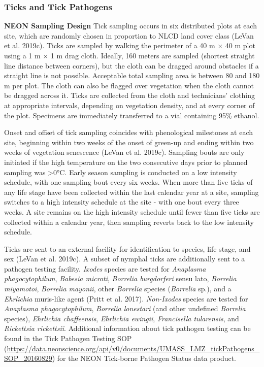 \documentclass[
  12pt,
]{article}
\begin{document}
\hypertarget{ticks-and-tick-pathogens}{%
\subsubsection{Ticks and Tick Pathogens}\label{ticks-and-tick-pathogens}}

\textbf{NEON Sampling Design} Tick sampling occurs in six distributed plots at each site, which are randomly chosen in proportion to NLCD land cover class (LeVan et al. 2019c). Ticks are sampled by walking the perimeter of a 40 m \(\times\) 40 m plot using a 1 m \(\times\) 1 m drag cloth. Ideally, 160 meters are sampled (shortest straight line distance between corners), but the cloth can be dragged around obstacles if a straight line is not possible. Acceptable total sampling area is between 80 and 180 m per plot. The cloth can also be flagged over vegetation when the cloth cannot be dragged across it. Ticks are collected from the cloth and technicians' clothing at appropriate intervals, depending on vegetation density, and at every corner of the plot. Specimens are immediately transferred to a vial containing 95\% ethanol.

Onset and offset of tick sampling coincides with phenological milestones at each site, beginning within two weeks of the onset of green-up and ending within two weeks of vegetation senescence (LeVan et al. 2019c). Sampling bouts are only initiated if the high temperature on the two consecutive days prior to planned sampling was \textgreater0°C. Early season sampling is conducted on a low intensity schedule, with one sampling bout every six weeks. When more than five ticks of any life stage have been collected within the last calendar year at a site, sampling switches to a high intensity schedule at the site - with one bout every three weeks. A site remains on the high intensity schedule until fewer than five ticks are collected within a calendar year, then sampling reverts back to the low intensity schedule.

Ticks are sent to an external facility for identification to species, life stage, and sex (LeVan et al. 2019c). A subset of nymphal ticks are additionally sent to a pathogen testing facility. \emph{Ixodes} species are tested for \emph{Anaplasma phagocytophilum}, \emph{Babesia microti}, \emph{Borrelia burgdorferi} sensu lato, \emph{Borrelia miyamotoi}, \emph{Borrelia mayonii}, other \emph{Borrelia} species (\emph{Borrelia} sp.), and a \emph{Ehrlichia} muris-like agent (Pritt et al. 2017). \emph{Non-Ixodes} species are tested for \emph{Anaplasma phagocytophilum}, \emph{Borrelia lonestari} (and other undefined \emph{Borrelia} species), \emph{Ehrlichia chaffeensis}, \emph{Ehrlichia ewingii}, \emph{Francisella tularensis}, and \emph{Rickettsia rickettsii}. Additional information about tick pathogen testing can be found in the Tick Pathogen Testing SOP (\url{https://data.neonscience.org/api/v0/documents/UMASS_LMZ_tickPathogens_SOP_20160829}) for the NEON Tick-borne Pathogen Status data product.
\end{document}
